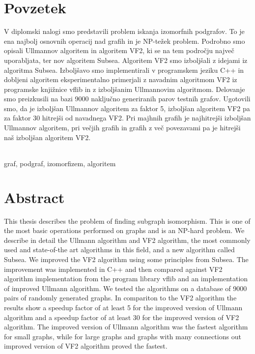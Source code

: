 \documentclass[a4paper, 12pt, ]{book}
\newcommand{\clearemptydoublepage}{\newpage{\pagestyle{empty}\cleardoublepage}}
\begin{document}
	\clearemptydoublepage
	

	
	
	
	\chapter*{Povzetek}
	V diplomski nalogi smo predstavili problem iskanja izomorfnih podgrafov. To je ena najbolj osnovnih operacij nad grafih in je NP-težek problem.
	Podrobno smo opisali Ullmannov algoritem in algoritem VF2, ki se na tem področju največ uporabljata, ter nov algoritem Subsea. Algoritem
	VF2 smo izboljšali z idejami iz algoritma Subsea. Izboljšavo smo implementirali v programskem jeziku C++ in dobljeni algoritem eksperimentalno 
	primerjali z navadnim algoritmom VF2 iz programske knjižnice vflib in z izboljšanim Ullmannovim algoritmom. Delovanje smo preizkusili na bazi 9000
	naključno generiranih parov testnih grafov. Ugotovili smo, da je izboljšan Ullmannov algoritem za faktor 5, izboljšan algoritem VF2 pa za faktor 30 hitrejši
	od navadnega VF2. Pri majhnih grafih je najhitrejši izboljšan Ullmannov algoritem, pri večjih grafih in grafih z več povezavami pa je hitrejši naš izboljšan
	algoritem VF2.

	
	\vspace{2cm}
	\\
	graf, podgraf, izomorfizem, algoritem
	
	
	\clearemptydoublepage
	
	
	
	
	
	\chapter*{Abstract}
	This thesis describes the problem of finding subgraph isomorphism. This is one of the most basic operations performed on graphs and is an NP-hard
	problem. We describe in detail the Ullmann algorithm and VF2 algorithm, the most commonly used and state-of-the art algorithms in this field, and a new 
	algorithm called Subsea. We improved the VF2 algorithm using some principles from Subsea. The improvement was implemented in C++ and then
	compared against VF2 algorithm implementation from the program library vflib and an implementation of improved Ullmann algorithm. We tested the
	algorithms on a database of 9000 pairs of randomly generated graphs. In compariton to the VF2 algorithm the results show a speedup factor of at least 5 	
	for the improved version of Ullmann algorithm and a speedup factor of at least 30 for the improved version of VF2 algorithm. The improved version of
	Ullmann algorithm was the fastest algorithm for small graphs, while for large graphs and graphs with many connections out improved version of VF2 
	algorithm proved the fastest.
	
\end{document}

